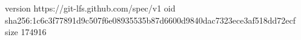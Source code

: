 version https://git-lfs.github.com/spec/v1
oid sha256:1c6c3f77891d9c507f6e08935535b87d6600d9840dac7323ece3af518dd72ecf
size 174916
